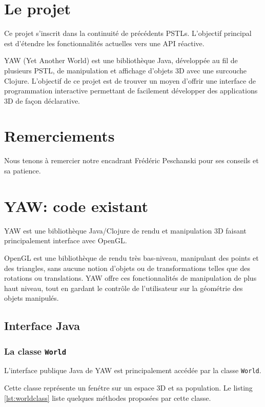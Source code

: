 \documentclass{report}
\begin{document}


\tableofcontents

\chapter{Le projet}

Ce projet s'inscrit dans la continuité de précédents PSTLs. L'objectif
principal est d'étendre les fonctionnalités actuelles vers une API réactive.

YAW (Yet Another World) est une bibliothèque Java, développée au fil de plusieurs
PSTL, de manipulation et affichage d'objets 3D avec une surcouche Clojure.
L'objectif de ce projet est de trouver un moyen d'offrir une interface de
programmation interactive permettant de facilement développer des applications
3D de façon déclarative.

\chapter{Remerciements}

Nous tenons à remercier notre encadrant Frédéric Peschanski pour ses conseils et
sa patience.

\chapter{YAW: code existant}

YAW est une bibliothèque Java/Clojure de rendu et manipulation 3D faisant principalement
interface avec OpenGL.

OpenGL est une bibliothèque de rendu très bas-niveau,
manipulant des points et des triangles, sans aucune notion d'objets ou de
transformations telles que des rotations ou translations.
YAW offre ces fonctionnalités de manipulation de plus haut niveau, tout en
gardant le contrôle de l'utilisateur sur la géométrie des objets manipulés.

\section{Interface Java}

\subsection{La classe \lstinline|World|}
L'interface publique Java de YAW est principalement accédée par la classe
\lstinline|World|.

Cette classe représente un fenétre sur un espace 3D et sa population.
Le listing \ref{lst:worldclass} liste quelques méthodes proposées par cette
classe.
\end{document}
